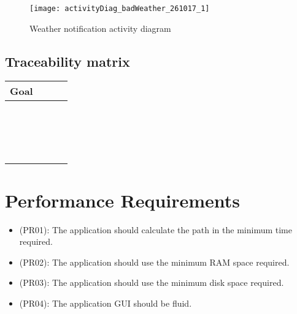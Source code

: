 \documentclass[a4paper,leqno]{book}
\begin{document}
\begin{figure}[!h]
	\begin{center}
		\texttt{[image: activityDiag\_badWeather\_261017\_1]}
	\end{center}
	\caption{Weather notification activity diagram}
\end{figure}

\subsection{Traceability matrix}
\begin{tabular}{|c|c|c|c|}
	\hline 
	\textbf{Goal}&  &  &  \\ 
	\hline 
	&  &  &  \\ 
	\hline 
	&  &  &  \\ 
	\hline 
	&  &  &  \\ 
	\hline 
	&  &  &  \\ 
	\hline 
	&  &  &  \\ 
	\hline 
	&  &  &  \\ 
	\hline 
	&  &  &  \\ 
	\hline 
	&  &  &  \\ 
	\hline 
	&  &  &  \\ 
	\hline 
	&  &  &  \\ 
	\hline 
	&  &  &  \\ 
	\hline 
	&  &  &  \\ 
	\hline 
	&  &  &  \\ 
	\hline 
	&  &  &  \\ 
	\hline 
	&  &  &  \\ 
	\hline 
	&  &  &  \\ 
	\hline 
	&  &  &  \\ 
	\hline 
\end{tabular} 


\newpage
\section{Performance Requirements}
\begin{itemize}
\item (PR01): The application should calculate the path in the minimum time required.
\item (PR02): The application should use the minimum RAM space required.
\item (PR03): The application should use the minimum disk space required.
\item (PR04): The application GUI should be fluid.
\end{itemize}
\end{document}
